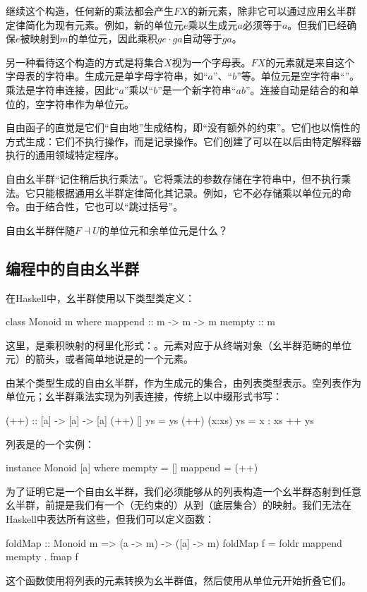 \documentclass[DaoFP]{subfiles}
\begin{document}
继续这个构造，任何新的乘法都会产生$F X$的新元素，除非它可以通过应用幺半群定律简化为现有元素。例如，新的单位元$e$乘以生成元$a$必须等于$a$。但我们已经确保$e$被映射到$m$的单位元，因此乘积$g e \cdot g a$自动等于$g a$。

另一种看待这个构造的方式是将集合$X$视为一个字母表。$F X$的元素就是来自这个字母表的字符串。生成元是单字母字符串，如“$a$”、“$b$”等。单位元是空字符串“”。乘法是字符串连接，因此“$a$”乘以“$b$”是一个新字符串“$ab$”。连接自动是结合的和单位的，空字符串作为单位元。

自由函子的直觉是它们“自由地”生成结构，即“没有额外的约束”。它们也以惰性的方式生成：它们不执行操作，而是记录操作。它们创建了可以在以后由特定解释器执行的通用领域特定程序。

自由幺半群“记住稍后执行乘法”。它将乘法的参数存储在字符串中，但不执行乘法。它只能根据通用幺半群定律简化其记录。例如，它不必存储乘以单位元的命令。由于结合性，它也可以“跳过括号”。

\begin{exercise}
自由幺半群伴随$F \dashv U$的单位元和余单位元是什么？
\end{exercise}

\subsection{编程中的自由幺半群}

在Haskell中，幺半群使用以下类型类定义：
\begin{haskell}
class Monoid m where
  mappend :: m -> m -> m
  mempty  :: m
\end{haskell}
这里，是乘积映射的柯里化形式：。元素对应于从终端对象（幺半群范畴的单位元）的箭头，或者简单地说是的一个元素。

由某个类型生成的自由幺半群，作为生成元的集合，由列表类型\hask{[a]}表示。空列表作为单位元；幺半群乘法实现为列表连接，传统上以中缀形式书写：
\begin{haskell}
(++) :: [a] -> [a] -> [a]
(++) []     ys = ys
(++) (x:xs) ys = x : xs ++ ys
\end{haskell}
列表是的一个实例：
\begin{haskell}
instance Monoid [a] where
  mempty = []
  mappend = (++)
\end{haskell}

为了证明它是一个自由幺半群，我们必须能够从的列表构造一个幺半群态射到任意幺半群，前提是我们有一个（无约束的）从到（底层集合）的映射。我们无法在Haskell中表达所有这些，但我们可以定义函数：
\begin{haskell}
foldMap :: Monoid m => (a -> m) -> ([a] -> m)
foldMap f = foldr mappend mempty . fmap f
\end{haskell}
这个函数使用将列表的元素转换为幺半群值，然后使用从单位元开始折叠它们。
\end{document}
